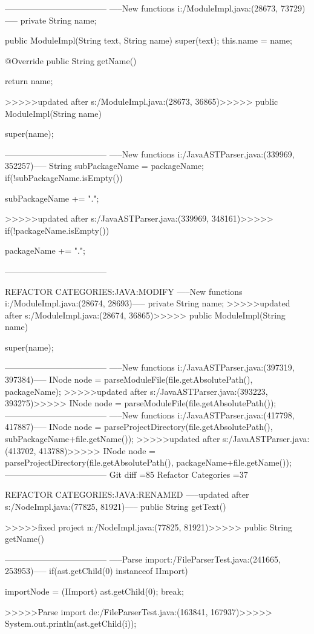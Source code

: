 {{{{{{{{{{{{{{{{------------------------------------
-----New functions i:/ModuleImpl.java:(28673, 73729)-----
	private String name;
	
	
	public ModuleImpl(String text, String name) {
		super(text);
		this.name = name;
	}

	@Override
	public String getName() {
		return name;
	
>>>>>updated after s:/ModuleImpl.java:(28673, 36865)>>>>>
	public ModuleImpl(String name) {
		super(name);
	
------------------------------------
-----New functions i:/JavaASTParser.java:(339969, 352257)-----
		String subPackageName = packageName;
		if(!subPackageName.isEmpty()){
			subPackageName += ".";
	
>>>>>updated after s:/JavaASTParser.java:(339969, 348161)>>>>>
		if(!packageName.isEmpty()){
			packageName += ".";
	
------------------------------------

REFACTOR CATEGORIES:JAVA:MODIFY
-----New functions i:/ModuleImpl.java:(28674, 28693)-----
private String name;
>>>>>updated after s:/ModuleImpl.java:(28674, 36865)>>>>>
public ModuleImpl(String name) {
		super(name);
	
------------------------------------
-----New functions i:/JavaASTParser.java:(397319, 397384)-----
INode node = parseModuleFile(file.getAbsolutePath(), packageName);
>>>>>updated after s:/JavaASTParser.java:(393223, 393275)>>>>>
INode node = parseModuleFile(file.getAbsolutePath());
------------------------------------
-----New functions i:/JavaASTParser.java:(417798, 417887)-----
INode node = parseProjectDirectory(file.getAbsolutePath(), subPackageName+file.getName());
>>>>>updated after s:/JavaASTParser.java:(413702, 413788)>>>>>
INode node = parseProjectDirectory(file.getAbsolutePath(), packageName+file.getName());
------------------------------------
Git diff =85  Refactor Categories =37

REFACTOR CATEGORIES:JAVA:RENAMED
-----updated after s:/NodeImpl.java:(77825, 81921)-----
	public String getText() {
	
>>>>>fixed project n:/NodeImpl.java:(77825, 81921)>>>>>
	public String getName() {
	
------------------------------------
-----Parse import:/FileParserTest.java:(241665, 253953)-----
			if(ast.getChild(0) instanceof IImport){
				importNode = (IImport) ast.getChild(0);
				break;
	
>>>>>Parse import de:/FileParserTest.java:(163841, 167937)>>>>>
			System.out.println(ast.getChild(i));
	
}}}}}}}}}}}}}}}}}}}}}}}}
